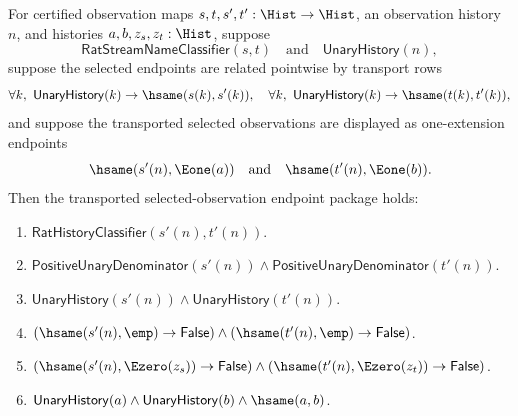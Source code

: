 \begin{theorem}
\label{thm:rat-stream-name-transported-observation-full-endpoint-package}
For certified observation maps $s,t,s',t':\Hist\to\Hist$, an observation
history $n$, and histories $a,b,z_s,z_t:\Hist$, suppose
$$
\mathsf{RatStreamNameClassifier}(s,t)\quad\text{and}\quad
\mathsf{UnaryHistory}(n),
$$
suppose the selected endpoints are related pointwise by transport rows
$$
\forall k,\ \mathsf{UnaryHistory}(k)\to\hsame(s(k),s'(k)),
\quad
\forall k,\ \mathsf{UnaryHistory}(k)\to\hsame(t(k),t'(k)),
$$
and suppose the transported selected observations are displayed as
one-extension endpoints
$$
\hsame(s'(n),\Eone(a))\quad\text{and}\quad \hsame(t'(n),\Eone(b)).
$$
Then the transported selected-observation endpoint package holds:
\begin{enumerate}
  \item $\mathsf{RatHistoryClassifier}(s'(n),t'(n))$.
  \item $\mathsf{PositiveUnaryDenominator}(s'(n))\land
  \mathsf{PositiveUnaryDenominator}(t'(n))$.
  \item $\mathsf{UnaryHistory}(s'(n))\land\mathsf{UnaryHistory}(t'(n))$.
  \item $(\hsame(s'(n),\emp)\to\mathsf{False})\land
  (\hsame(t'(n),\emp)\to\mathsf{False})$.
  \item $(\hsame(s'(n),\Ezero(z_s))\to\mathsf{False})\land
  (\hsame(t'(n),\Ezero(z_t))\to\mathsf{False})$.
  \item $\mathsf{UnaryHistory}(a)\land\mathsf{UnaryHistory}(b)\land
  \hsame(a,b)$.
\end{enumerate}
\end{theorem}
